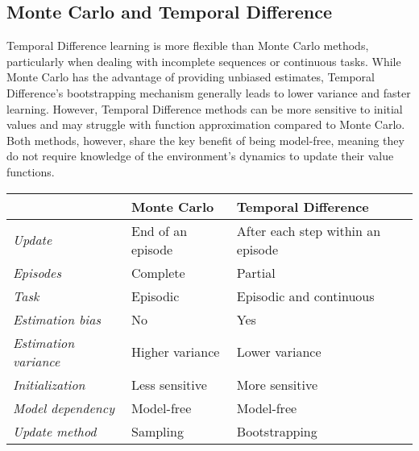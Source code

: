 \subsection{Monte Carlo and Temporal Difference}
Temporal Difference learning is more flexible than Monte Carlo methods, particularly when dealing with incomplete sequences or continuous tasks.
While Monte Carlo has the advantage of providing unbiased estimates, Temporal Difference's bootstrapping mechanism generally leads to lower variance and faster learning. 
However, Temporal Difference methods can be more sensitive to initial values and may struggle with function approximation compared to Monte Carlo. 
Both methods, however, share the key benefit of being model-free, meaning they do not require knowledge of the environment's dynamics to update their value functions.
\begin{table}[H]
    \centering
    \begin{tabular}{|l|l|l|}
    \hline
    & \textbf{Monte Carlo} & \textbf{Temporal Difference} \\ \hline
    \textit{Update} & End of an episode & After each step within an episode \\ \hline
    \textit{Episodes} & Complete & Partial \\ \hline
    \textit{Task} & Episodic & Episodic and continuous \\ \hline
    \textit{Estimation bias} & No & Yes \\ \hline
    \textit{Estimation variance} & Higher variance & Lower variance \\ \hline
    \textit{Initialization} & Less sensitive & More sensitive \\ \hline
    \textit{Model dependency} & Model-free & Model-free \\ \hline
    \textit{Update method} & Sampling & Bootstrapping \\ \hline
    \end{tabular}
\end{table}